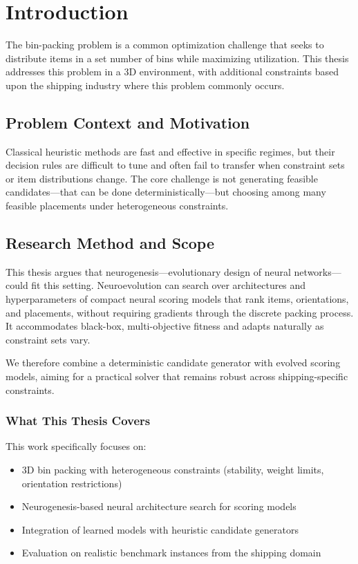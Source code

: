 \chapter{Introduction}

The bin-packing problem is a common optimization challenge that seeks to distribute items in a set number of bins while maximizing utilization. This thesis addresses this problem in a 3D environment, with additional constraints based upon the shipping industry where this problem commonly occurs.

\section{Problem Context and Motivation}

Classical heuristic methods are fast and effective in specific regimes, but their decision rules are difficult to tune and often fail to transfer when constraint sets or item distributions change. The core challenge is not generating feasible candidates---that can be done deterministically---but choosing among many feasible placements under heterogeneous constraints.

\section{Research Method and Scope}

This thesis argues that neurogenesis---evolutionary design of neural networks---could fit this setting. Neuroevolution can search over architectures and hyperparameters of compact neural scoring models that rank items, orientations, and placements, without requiring gradients through the discrete packing process. It accommodates black-box, multi-objective fitness and adapts naturally as constraint sets vary.

We therefore combine a deterministic candidate generator with evolved scoring models, aiming for a practical solver that remains robust across shipping-specific constraints.

\subsection{What This Thesis Covers}

This work specifically focuses on:
\begin{itemize}
    \item 3D bin packing with heterogeneous constraints (stability, weight limits, orientation restrictions)
    \item Neurogenesis-based neural architecture search for scoring models
    \item Integration of learned models with heuristic candidate generators
    \item Evaluation on realistic benchmark instances from the shipping domain
\end{itemize}

